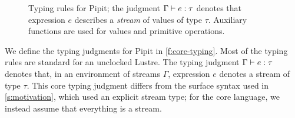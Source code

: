 \documentclass[a4paper,UKenglish,cleveref, autoref, thm-restate,anonymous]{lipics-v2021}
\begin{document}
\begin{figure}
  \begin{mathpar}
\end{mathpar}


  \caption{Typing rules for Pipit; the judgment $\typing{\Gamma}{e}{\tau}$ denotes that expression $e$ describes a \emph{stream} of values of type $\tau$. Auxiliary functions are used for values and primitive operations.}\label{f:core-typing}
\end{figure} 
We define the typing judgments for Pipit in \autoref{f:core-typing}.
Most of the typing rules are standard for an unclocked Lustre.
The typing judgment $\typing{\Gamma}{e}{\tau}$ denotes that, in an environment of streams $\Gamma$, expression $e$ denotes a stream of type $\tau$.
This core typing judgment differs from the surface syntax used in \autoref{s:motivation}, which used an explicit stream type; for the core language, we instead assume that everything is a stream.
\end{document}
